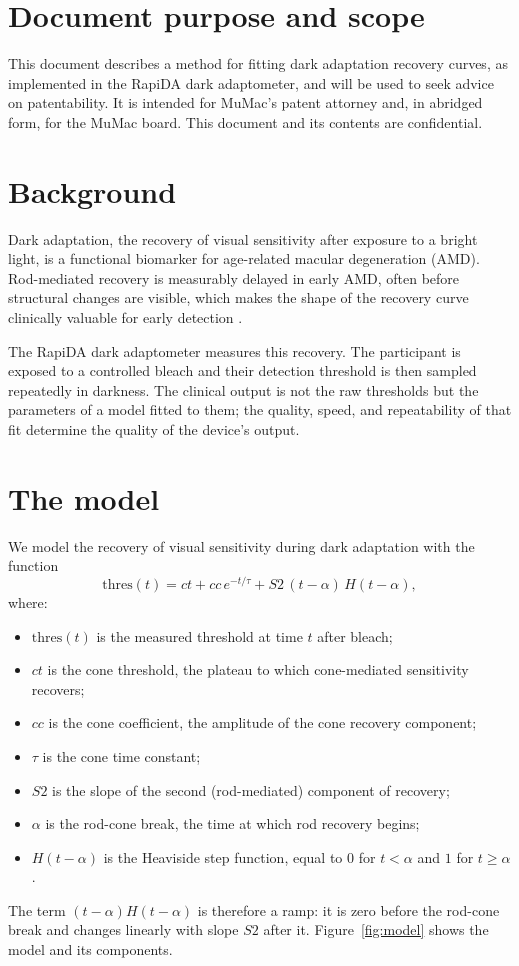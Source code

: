 \documentclass[11pt,a4paper]{article}
\begin{document}
\vspace{6mm}
\section{Document purpose and scope}
This document describes a method for fitting dark adaptation recovery
curves, as implemented in the RapiDA dark adaptometer, and will be used to 
seek advice on patentability. It is intended for MuMac's patent attorney
and, in abridged form, for the MuMac board. This document and its contents
are confidential.

\section{Background}
Dark adaptation, the recovery of visual sensitivity after exposure to a
bright light, is a functional biomarker for age-related macular
degeneration (AMD). Rod-mediated recovery is measurably delayed in early
AMD, often before structural changes are visible, which makes the shape of
the recovery curve clinically valuable for early detection \cite{Jackson:2014aa}.

The RapiDA dark adaptometer measures this recovery. The participant is
exposed to a controlled bleach and their detection threshold is then
sampled repeatedly in darkness. The clinical output is not the raw
thresholds but the parameters of a model fitted to them; the quality,
speed, and repeatability of that fit determine the quality of the device's
output.

\section{The model}
We model the recovery of visual sensitivity during dark adaptation with
the function
\begin{equation}
\text{thres}(t) = ct + cc\,e^{-t/\tau} + S2\,(t-\alpha)\,H(t-\alpha),
\label{eq:model}
\end{equation}
where:
\begin{itemize}[nosep]
\item $\text{thres}(t)$ is the measured threshold at time $t$ after bleach;
\item $ct$ is the cone threshold, the plateau to which cone-mediated
  sensitivity recovers;
\item $cc$ is the cone coefficient, the amplitude of the cone recovery
  component;
\item $\tau$ is the cone time constant;
\item $S2$ is the slope of the second (rod-mediated) component of
  recovery;
\item $\alpha$ is the rod-cone break, the time at which rod recovery
  begins;
\item $H(t-\alpha)$ is the Heaviside step function, equal to $0$ for
  $t < \alpha$ and $1$ for $t \geq \alpha$.
\end{itemize}
The term $(t-\alpha)H(t-\alpha)$ is therefore a ramp: it is zero before
the rod-cone break and changes linearly with slope $S2$ after it.
Figure~\ref{fig:model} shows the model and its components.
\end{document}

